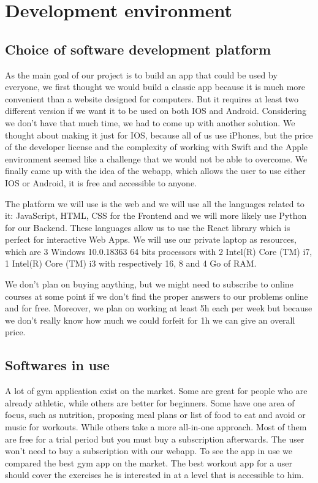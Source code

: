 \documentclass[conference]{IEEEtran}
\begin{document}
\section{Development environment}
\subsection{Choice of software development platform}
As the main goal of our project is to build an app that could be used by everyone, we first thought we would build a classic app because it is much more convenient than a website designed for computers.  But it requires at least two different version if we want it to be used on both IOS and Android. Considering we don’t have that much time, we had to come up with another solution. We thought about making it just for IOS, because all of us use iPhones, but the price of the developer license and the complexity of working with Swift and the Apple environment seemed like a challenge that we would not be able to overcome. We finally came up with the idea of the webapp, which allows the user to use either IOS or Android, it is free and accessible to anyone.  

The platform we will use is the web and we will use all the languages related to it: JavaScript, HTML, CSS for the Frontend and we will more likely use Python for our Backend. These languages allow us to use the React library which is perfect for interactive Web Apps. We will use our private laptop as resources, which are 3 Windows 10.0.18363 64 bits processors with 2 Intel(R) Core (TM) i7, 1 Intel(R) Core (TM) i3 with respectively 16, 8 and 4 Go of RAM.

We don’t plan on buying anything, but we might need to subscribe to online courses at some point if we don’t find the proper answers to our problems online and for free. Moreover, we plan on working at least 5h each per week but because we don’t really know how much we could forfeit for 1h we can give an overall price. 

\subsection{Softwares in use}
A lot of gym application exist on the market. Some are great for people who are already athletic, while others are better for beginners. Some have one area of focus, such as nutrition, proposing meal plans or list of food to eat and avoid or music for workouts. While others take a more all-in-one approach. Most of them are free for a trial period but you must buy a subscription afterwards. The user won’t need to buy a subscription with our webapp. To see the app in use we compared the best gym app on the market. The best workout app for a user should cover the exercises he is interested in at a level that is accessible to him.
\end{document}

